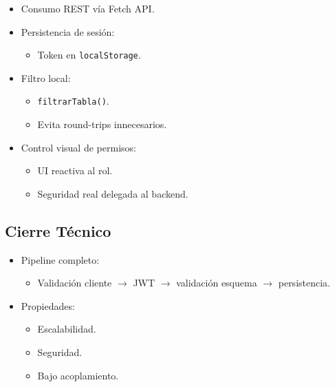\documentclass[12pt,letterpaper]{article}
\begin{document}
\begin{itemize}
    \item Consumo REST vía Fetch API.
    \item Persistencia de sesión:
    \begin{itemize}
        \item Token en \texttt{localStorage}.
    \end{itemize}
    \item Filtro local:
    \begin{itemize}
        \item \texttt{filtrarTabla()}.
        \item Evita round-trips innecesarios.
    \end{itemize}
    \item Control visual de permisos:
    \begin{itemize}
        \item UI reactiva al rol.
        \item Seguridad real delegada al backend.
    \end{itemize}
\end{itemize}

\subsection{Cierre Técnico}

\begin{itemize}
    \item Pipeline completo:
    \begin{itemize}
        \item Validación cliente $\rightarrow$ JWT $\rightarrow$ validación esquema $\rightarrow$ persistencia.
    \end{itemize}
    \item Propiedades:
    \begin{itemize}
        \item Escalabilidad.
        \item Seguridad.
        \item Bajo acoplamiento.
    \end{itemize}
\end{itemize}
\end{document}
